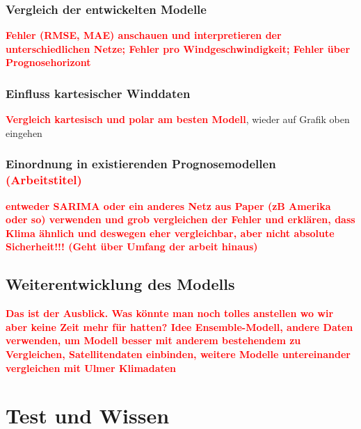 \documentclass[
12pt, %
toc=listofnumbered, %
toc=chapterentrydotfill, %
numbers=noenddot, %
captions=tableheading, %
]{scrreprt}
\let\Oldsection\section
\renewcommand{\section}{\FloatBarrier\Oldsection}
\let\Oldsubsection\subsection
\renewcommand{\subsection}{\FloatBarrier\Oldsubsection}
\newcommand{\highlight}[1]{\textbf{\textcolor{red}{#1}}}
\begin{document}
\subsection{Vergleich der entwickelten Modelle}
\highlight{Fehler (RMSE, MAE) anschauen und interpretieren der unterschiedlichen Netze; 
Fehler pro Windgeschwindigkeit; Fehler über Prognosehorizont}

\subsection{Einfluss kartesischer Winddaten}
\highlight{Vergleich kartesisch und polar am besten Modell}, wieder auf Grafik oben eingehen

\subsection{Einordnung in existierenden Prognosemodellen \highlight{(Arbeitstitel)}}
\highlight{entweder SARIMA oder ein anderes Netz aus Paper (zB Amerika oder so) verwenden und grob vergleichen der Fehler und erklären, dass
 Klima ähnlich und deswegen eher vergleichbar, aber nicht absolute Sicherheit!!! (Geht über Umfang der arbeit hinaus)}

\section{Weiterentwicklung des Modells}
\highlight{Das ist der Ausblick. Was könnte man noch tolles anstellen wo wir aber keine Zeit mehr für hatten? Idee Ensemble-Modell, andere Daten 
verwenden, um Modell besser mit anderem bestehendem zu Vergleichen, Satellitendaten einbinden, weitere Modelle untereinander vergleichen mit Ulmer Klimadaten}

\chapter{Test und Wissen}
\end{document}
